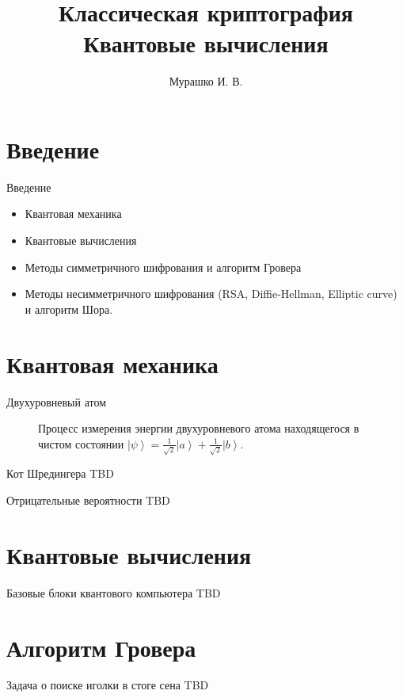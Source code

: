 \documentclass[10pt,pdf,hyperref={unicode}]{beamer}
\title[Криптография и квантовые вычисления]{Классическая
  криптография\\Квантовые вычисления}
\author{Мурашко И. В.}
\institute{Санкт Петербургский Государственный Политехнический Университет}
\date{}
\begin{document}
\section{Введение}

\begin{frame}{Введение}
\begin{itemize}
\item Квантовая механика
\item Квантовые вычисления
\item Методы симметричного шифрования и алгоритм Гровера
\item Методы несимметричного шифрования (RSA, Diffie-Hellman, Elliptic
curve) и алгоритм Шора.
\end{itemize}
\end{frame}

\section{Квантовая механика}
\begin{frame}{Двухуровневый атом}
\begin{figure}
\centering



\caption{Процесс измерения энергии двухуровневого атома находящегося в
чистом состоянии $\left|\psi\right> = 
\frac{1}{\sqrt{2}}\left|a\right> + \frac{1}{\sqrt{2}}\left|b\right>$.}
\label{fig:add:mesure_ex}
\end{figure}
\end{frame}

\begin{frame}{Кот Шредингера}
TBD
\end{frame}

\begin{frame}{Отрицательные вероятности}
TBD
\end{frame}

\section{Квантовые вычисления}
\begin{frame}{Базовые блоки квантового компьютера}
TBD
\end{frame}

\section{Алгоритм Гровера}
\begin{frame}{Задача о поиске иголки в стоге сена}
TBD
\end{frame}
\end{document}
